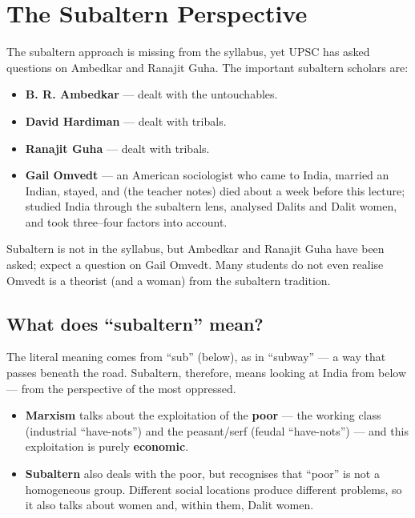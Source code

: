 \section{The Subaltern Perspective}

The subaltern approach is missing from the syllabus, yet UPSC has asked questions on Ambedkar and Ranajit Guha. The important subaltern scholars are:
\begin{itemize}
\item \textbf{B. R. Ambedkar} --- dealt with the untouchables.
\item \textbf{David Hardiman} --- dealt with tribals.
\item \textbf{Ranajit Guha} --- dealt with tribals.
\item \textbf{Gail Omvedt} --- an American sociologist who came to India, married an Indian, stayed, and (the teacher notes) died about a week before this lecture; studied India through the subaltern lens, analysed Dalits and Dalit women, and took three--four factors into account.
\end{itemize}

\begin{PYQLink}
Subaltern is not in the syllabus, but Ambedkar and Ranajit Guha have been asked; expect a question on Gail Omvedt. Many students do not even realise Omvedt is a theorist (and a woman) from the subaltern tradition.
\end{PYQLink}

\subsection{What does ``subaltern'' mean?}

The literal meaning comes from ``sub'' (below), as in ``subway'' --- a way that passes beneath the road. Subaltern, therefore, means looking at India from below --- from the perspective of the most oppressed.

\begin{ComparisonBox}
\begin{itemize}
\item \textbf{Marxism} talks about the exploitation of the \textbf{poor} --- the working class (industrial ``have-nots'') and the peasant/serf (feudal ``have-nots'') --- and this exploitation is purely \textbf{economic}.
\item \textbf{Subaltern} also deals with the poor, but recognises that ``poor'' is not a homogeneous group. Different social locations produce different problems, so it also talks about women and, within them, Dalit women.
\end{itemize}
\end{ComparisonBox}

